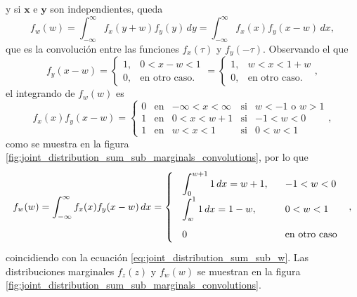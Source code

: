 \documentclass[a4paper]{report}
\newcommand{\x}{\mathbf{x}}
\newcommand{\y}{\mathbf{y}}
\begin{document}
y si \(\x\) e \(\y\) son independientes, queda
\begin{equation}\label{eq:pdf_of_subtract_of_two_independents_rv}
 f_w(w)=\int_{-\infty}^{\infty}f_x(y+w)f_y(y)\,dy=\int_{-\infty}^{\infty}f_x(x)f_y(x-w)\,dx,
\end{equation}
que es la convolución entre las funciones \(f_x(\tau)\) y \(f_y(-\tau)\).
Observando el que
\[
  f_y(x-w)=
 \left\{\begin{array}{ll}
   1, &  0<x-w<1\\
   0, & \textrm{en otro caso.}
 \end{array} \right.=
 \left\{\begin{array}{ll}
   1, &  w<x<1+w\\
   0, & \textrm{en otro caso.}
 \end{array} \right.,
\]
el integrando de \(f_w(w)\) es
\begin{equation}\label{eq:joint_distribution_sum_sub_fw_deduction}
   f_x(x)f_y(x-w)=
 \left\{\begin{array}{llclc}
   0 &  \textrm{en} &-\infty<x<\infty & \textrm{si} & w<-1\textrm{ o }w>1\\
   1 &  \textrm{en} & 0<x<w+1 & \textrm{si} & -1<w<0\\
   1 &  \textrm{en} & w<x<1 & \textrm{si} & 0<w<1
 \end{array}\right.,
\end{equation}
como se muestra en la figura \ref{fig:joint_distribution_sum_sub_marginals_convolutions},
por lo que
\[
 f_w(w)=\int_{-\infty}^{\infty}f_x(x)f_y(x-w)\,dx
\def\arraystretch{2}\arraycolsep=9pt
 =\left\{\begin{array}{ll}
   \displaystyle\int_{0}^{w+1}1\,dx=w+1, &  -1<w<0\\
   \displaystyle\int_{w}^{1}1\,dx=1-w, & 0<w<1\\ 
   0 & \textrm{en otro caso}
 \end{array} \right., 
\]
coincidiendo con la ecuación \ref{eq:joint_distribution_sum_sub_w}. Las distribuciones marginales \(f_z(z)\) y \(f_w(w)\) se muestran en la figura \ref{fig:joint_distribution_sum_sub_marginals_convolutions}.
\end{document}
